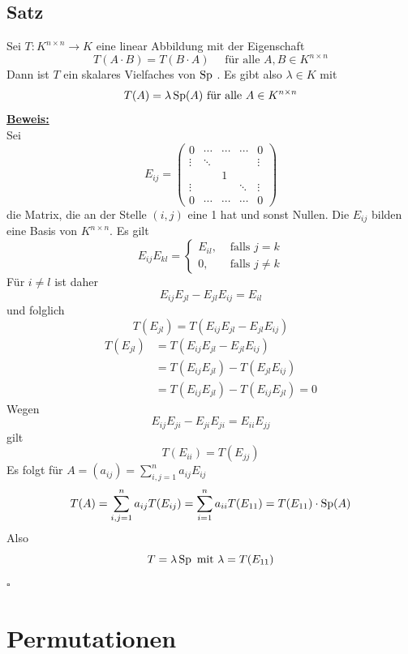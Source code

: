 \subsection{Satz} %
\label{sub:satz}
Sei $T : K^{n \times n} \to K $ eine linear Abbildung mit der Eigenschaft
\[
	T(A \cdot B) = T(B \cdot A) \quad \text{ für alle } A,B \in K^{n \times n}
\]
Dann ist $T$ ein skalares Vielfaches von $\operatorname{Sp}$ . Es gibt also $\lambda \in K$ mit 
\[
	T(A)= \lambda \operatorname{Sp} (A) \text{ für alle } A \in K^{n \times n}
\]
\underline{\textbf{Beweis:}} \\
Sei 
\[
	E_{ij} = \begin{pmatrix}
		 0 & \cdots & \cdots  & \cdots & 0  \\
		 \vdots & \ddots & & & \vdots \\
		  & & 1 & &   \\
		  \vdots &  &  &\ddots  &  \vdots \\
		 0 & \cdots & \cdots & \cdots & 0
	\end{pmatrix} \tag{an der stelle i,j 1}
\]
die Matrix, die an der Stelle $(i,j)$ eine 1 hat und sonst Nullen. Die $E_{ij}$ bilden eine Basis von $K^{n \times n}$.  Es gilt
\[
	E_{ij} E_{kl} = \begin{cases}
		E_{il}, &\text{ falls } j=k\\
		0 , &\text{ falls } j \not= k
	\end{cases}
\]
Für $i \not= l$ ist daher
\[
	E_{ij} E_{jl}- E_{jl} E_{ij} = E_{il}
\]
und folglich
\[
	T(E_{jl}) = T( E_{ij} E_{jl}- E_{jl} E_{ij} )
\]
\begin{align*}
	T(E_{jl}) &= T( E_{ij} E_{jl}- E_{jl} E_{ij} ) \\
	&= T(E_{ij} E_{jl})- T(E_{jl} E_{ij}) \\
	&= T(E_{ij} E_{jl}) - T( E_{ij} E_{jl}) = 0
\end{align*}
Wegen
\[
	E_{ij} E_{ji} - E_{ji} E_{ji} = E_{ii} E_{jj}
\]
gilt
\[
	T(E_{ii}) = T( E_{jj})
\]
Es folgt für $A= (a_{ij}) = \sum\limits_{i,j=1}^{n} a_{ij}E_{ij} $
\[
	T(A)= \sum\limits_{i,j=1}^{n} a_{ij} T(E_{ij}) = \sum\limits_{i=1}^{n} a_{ii}  T(E_{11})= T(E_{11}) \cdot  \operatorname{Sp} (A)
\]
Also
\[
	T= \lambda \operatorname{Sp} \text{ mit } \lambda = T(E_{11})
\]
\hfill \( \square \)


\section{Permutationen} %
\label{sec:permutatationen}

